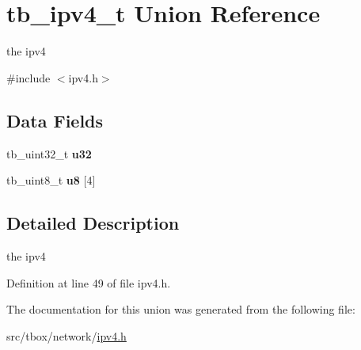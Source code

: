 \hypertarget{uniontb__ipv4__t}{\section{tb\-\_\-ipv4\-\_\-t Union Reference}
\label{uniontb__ipv4__t}
}


the ipv4  




{\ttfamily \#include $<$ipv4.\-h$>$}

\subsection*{Data Fields}
\begin{DoxyCompactItemize}
\item 
\hypertarget{uniontb__ipv4__t_a7b15f3f7526d0618f49a03e5e141b65e}{tb\-\_\-uint32\-\_\-t {\bfseries u32}}\label{uniontb__ipv4__t_a7b15f3f7526d0618f49a03e5e141b65e}

\item 
\hypertarget{uniontb__ipv4__t_a923d5c0984f486b5a7755cd522245c41}{tb\-\_\-uint8\-\_\-t {\bfseries u8} \mbox{[}4\mbox{]}}\label{uniontb__ipv4__t_a923d5c0984f486b5a7755cd522245c41}

\end{DoxyCompactItemize}


\subsection{Detailed Description}
the ipv4 

Definition at line 49 of file ipv4.\-h.



The documentation for this union was generated from the following file\-:\begin{DoxyCompactItemize}
\item 
src/tbox/network/\hyperlink{ipv4_8h}{ipv4.\-h}\end{DoxyCompactItemize}

